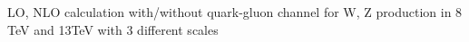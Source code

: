 \documentclass[10pt]{article}
\begin{document}
LO, NLO calculation with/without quark-gluon channel for W, Z production in 8 TeV and 13TeV with 3 different scales 
\end{document}
